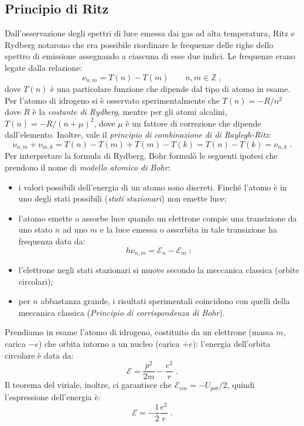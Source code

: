 \documentclass[10pt,a4paper]{report}
\theoremstyle{definition}
\numberwithin{equation}{section}
\begin{document}
\subsection{Principio di Ritz}
Dall'osservazione degli spettri di luce emessa dai gas ad alta temperatura, Ritz e Rydberg notarono che era possibile riordinare le frequenze delle righe dello spettro di emissione assegnando a ciascuna di esse due indici. Le frequenze erano legate dalla relazione:
\begin{equation}
\nu_{n,m}=T(n)-T(m) \qquad n,m\in \mathbb{Z}\;,
\end{equation}
dove $T(n)$ è una particolare funzione che dipende dal tipo di atomo in esame. Per l'atomo di idrogeno si è osservato sperimentalmente che $T(n)=-R/n^2$ dove $R$ è la \textit{costante di Rydberg}, mentre per gli atomi alcalini, $T(n)=-R/(n+\mu)^2$, dove $\mu$ è un fattore di correzione che dipende dall'elemento. Inoltre, vale il \textit{principio di combinazione di di Raylegh-Ritz}:
\begin{equation}
\nu_{n,m}+\nu_{m,k}=T(n)-T(m)+T(m)-T(k)=T(n)-T(k)=\nu_{n,k}\;.
\end{equation}
Per interpretare la formula di Rydberg, Bohr formulò le seguenti ipotesi che prendono il nome di \textit{modello atomico di Bohr}:
\begin{itemize}
\item i valori possibili dell'energia di un atomo sono discreti. Finché l'atomo è in uno degli stati possibili (\textit{stati stazionari}) non emette luce;
\item l'atomo emette o assorbe luce quando un elettrone compie una transizione da uno stato $n$ ad uno $m$ e la luce emessa o assorbita in tale transizione ha frequenza data da:
$$
h\nu_{n,m}=\mathcal{E}_n-\mathcal{E}_m\;;
$$
\item l'elettrone negli stati stazionari si muove secondo la meccanica classica (orbite circolari);
\item per $n$ abbastanza grande, i risultati sperimentali coincidono con quelli della meccanica classica (\textit{Principio di corrispondenza di Bohr}).
\end{itemize}
Prendiamo in esame l'atomo di idrogeno, costituito da un elettrone (massa $m$, carica $-e$) che orbita intorno a un nucleo (carica $+e$): l'energia dell'orbita circolare è data da:
$$
\mathcal{E}=\frac{p^2}{2m}-\frac{e^2}{r}\;.
$$
Il teorema del viriale, inoltre, ci garantisce che $\mathcal{E}_{cin}=-U_{pot}/2$, quindi l'espressione dell'energia è:
\begin{equation}
\mathcal{E}=-\frac{1}{2}\frac{e^2}{r}\;. \label{ch1_energy}
\end{equation}
\end{document}
